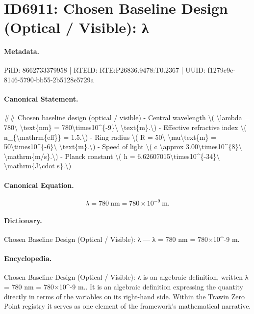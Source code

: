 \section*{ID6911: Chosen Baseline Design (Optical / Visible): λ}
\paragraph{Metadata.}
PiID: 8662733379958 | RTEID: RTE:P26836.9478:T0.2367 | UUID: f1279c9c-8146-5790-bb55-2b5128e5729a

\paragraph{Canonical Statement.}
\#\# Chosen baseline design (optical / visible) - Central wavelength \textbackslash{}( \textbackslash{}lambda = 780\textbackslash{} \textbackslash{}text\{nm\} = 780\textbackslash{}times10\textasciicircum{}\{-9\}\textbackslash{} \textbackslash{}text\{m\}.\textbackslash{}) - Effective refractive index \textbackslash{}( n\_\{\textbackslash{}mathrm\{eff\}\} = 1.5.\textbackslash{}) - Ring radius \textbackslash{}( R = 50\textbackslash{} \textbackslash{}mu\textbackslash{}text\{m\} = 50\textbackslash{}times10\textasciicircum{}\{-6\}\textbackslash{} \textbackslash{}text\{m\}.\textbackslash{}) - Speed of light \textbackslash{}( c \textbackslash{}approx 3.00\textbackslash{}times10\textasciicircum{}\{8\}\textbackslash{} \textbackslash{}mathrm\{m/s\}.\textbackslash{}) - Planck constant \textbackslash{}( h = 6.62607015\textbackslash{}times10\textasciicircum{}\{-34\}\textbackslash{} \textbackslash{}mathrm\{J\textbackslash{}cdot s\}.\textbackslash{})

\paragraph{Canonical Equation.}
\[
\lambda = 780\ \text{nm} = 780\times10^{-9}\ \text{m}.
\]

\paragraph{Dictionary.}
Chosen Baseline Design (Optical / Visible): λ — λ = 780 nm = 780×10\textasciicircum{}-9 m.

\paragraph{Encyclopedia.}
Chosen Baseline Design (Optical / Visible): λ is an algebraic definition, written λ = 780 nm = 780×10\textasciicircum{}-9 m.. It is an algebraic definition expressing the quantity directly in terms of the variables on its right-hand side. Within the Trawin Zero Point registry it serves as one element of the framework's mathematical narrative.
